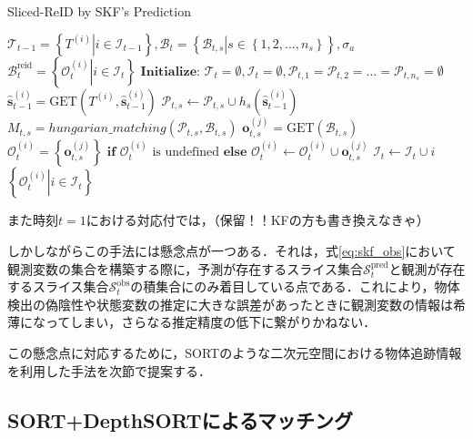     \begin{algorithm}[t]
        \caption{Sliced-ReID by SKF's Prediction}
        \label{alg:skf_matching}
        \begin{algorithmic}[1]
            \REQUIRE $\mathcal{T}_{t-1} = \left\{ \left. T^{(i)}\right| i \in \mathcal{I}_{t-1}\right\} , \mathcal{B}_t = \left\{\left. \mathcal{B}_{t,s} \right| s \in \left\{1,2,\dots,n_s\right\}\right\},\sigma_a$ 
            \ENSURE $\mathcal{B}_t^{\text{reid}} = \left\{\left.\mathcal{O}_t^{(i)}\right|i \in \mathcal{I}_t\right\}$
            \STATE $\textbf{Initialize: } \mathcal{T}_t = \emptyset, \mathcal{I}_t = \emptyset,\mathcal{P}_{t,1} = \mathcal{P}_{t,2}=\dots=\mathcal{P}_{t,n_s} = \emptyset$
                    \STATE $\hat{\bm{s}}_{t-1}^{(i)} = \text{GET}(T^{(i)}, \hat{\bm{s}}_{t-1}^{(i)})$
                    \STATE $\mathcal{P}_{t,s} \leftarrow \mathcal{P}_{t,s} \cup h_s(\hat{\bm{s}}_{t-1}^{(i)})$
                \ENDFOR
            \ENDFOR
                \STATE $M_{t,s} = hungarian\_matching(\mathcal{P}_{t,s}, \mathcal{B}_{t,s})$
                    \STATE $\bm{o}_{t,s}^{(j)} = \text{GET}(\mathcal{B}_{t,s})$
                    \STATE $\mathcal{O}_t^{(i)} = \left\{\bm{o}_{t,s}^{(j)}\right\} \textbf{ if } \mathcal{O}_t^{(i)} \text{ is undefined} \textbf{ else } \mathcal{O}_t^{(i)} \leftarrow \mathcal{O}_t^{(i)} \cup \bm{o}_{t,s}^{(j)}$
                    \STATE $\mathcal{I}_t \leftarrow \mathcal{I}_t \cup i$
                \ENDFOR
            \ENDFOR
            \RETURN $\left\{\left.\mathcal{O}_t^{(i)}\right|i \in \mathcal{I}_t\right\}$
        \end{algorithmic}
    \end{algorithm}

    また時刻$t=1$における対応付では，（保留！！KFの方も書き換えなきゃ）
    \par
    しかしながらこの手法には懸念点が一つある．それは，式\ref{eq:skf_obs}において観測変数の集合を構築する際に，予測が存在するスライス集合$\mathcal{S}_t^{\text{pred}}$と観測が存在するスライス集合$\mathcal{S}_t^{\text{obs}}$の積集合にのみ着目している点である．これにより，物体検出の偽陰性や状態変数の推定に大きな誤差があったときに観測変数の情報は希薄になってしまい，さらなる推定精度の低下に繋がりかねない．
    \par
    この懸念点に対応するために，SORTのような二次元空間における物体追跡情報を利用した手法を次節で提案する．

    \subsection{SORT+DepthSORTによるマッチング}